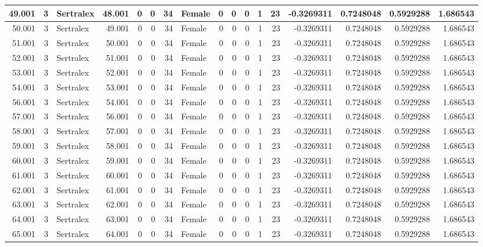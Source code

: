 \documentclass[
]{book}
\begin{document}
\begin{table}
\begin{tabular}[t]{r|r|l|r|r|r|r|l|r|r|r|r|r|r|r|r|r}
\hline
49.001 & 3 & Sertralex & 48.001 & 0 & 0 & 34 & Female & 0 & 0 & 0 & 1 & 23 & -0.3269311 & 0.7248048 & 0.5929288 & 1.686543\\
\hline
50.001 & 3 & Sertralex & 49.001 & 0 & 0 & 34 & Female & 0 & 0 & 0 & 1 & 23 & -0.3269311 & 0.7248048 & 0.5929288 & 1.686543\\
\hline
51.001 & 3 & Sertralex & 50.001 & 0 & 0 & 34 & Female & 0 & 0 & 0 & 1 & 23 & -0.3269311 & 0.7248048 & 0.5929288 & 1.686543\\
\hline
52.001 & 3 & Sertralex & 51.001 & 0 & 0 & 34 & Female & 0 & 0 & 0 & 1 & 23 & -0.3269311 & 0.7248048 & 0.5929288 & 1.686543\\
\hline
53.001 & 3 & Sertralex & 52.001 & 0 & 0 & 34 & Female & 0 & 0 & 0 & 1 & 23 & -0.3269311 & 0.7248048 & 0.5929288 & 1.686543\\
\hline
54.001 & 3 & Sertralex & 53.001 & 0 & 0 & 34 & Female & 0 & 0 & 0 & 1 & 23 & -0.3269311 & 0.7248048 & 0.5929288 & 1.686543\\
\hline
56.001 & 3 & Sertralex & 54.001 & 0 & 0 & 34 & Female & 0 & 0 & 0 & 1 & 23 & -0.3269311 & 0.7248048 & 0.5929288 & 1.686543\\
\hline
57.001 & 3 & Sertralex & 56.001 & 0 & 0 & 34 & Female & 0 & 0 & 0 & 1 & 23 & -0.3269311 & 0.7248048 & 0.5929288 & 1.686543\\
\hline
58.001 & 3 & Sertralex & 57.001 & 0 & 0 & 34 & Female & 0 & 0 & 0 & 1 & 23 & -0.3269311 & 0.7248048 & 0.5929288 & 1.686543\\
\hline
59.001 & 3 & Sertralex & 58.001 & 0 & 0 & 34 & Female & 0 & 0 & 0 & 1 & 23 & -0.3269311 & 0.7248048 & 0.5929288 & 1.686543\\
\hline
60.001 & 3 & Sertralex & 59.001 & 0 & 0 & 34 & Female & 0 & 0 & 0 & 1 & 23 & -0.3269311 & 0.7248048 & 0.5929288 & 1.686543\\
\hline
61.001 & 3 & Sertralex & 60.001 & 0 & 0 & 34 & Female & 0 & 0 & 0 & 1 & 23 & -0.3269311 & 0.7248048 & 0.5929288 & 1.686543\\
\hline
62.001 & 3 & Sertralex & 61.001 & 0 & 0 & 34 & Female & 0 & 0 & 0 & 1 & 23 & -0.3269311 & 0.7248048 & 0.5929288 & 1.686543\\
\hline
63.001 & 3 & Sertralex & 62.001 & 0 & 0 & 34 & Female & 0 & 0 & 0 & 1 & 23 & -0.3269311 & 0.7248048 & 0.5929288 & 1.686543\\
\hline
64.001 & 3 & Sertralex & 63.001 & 0 & 0 & 34 & Female & 0 & 0 & 0 & 1 & 23 & -0.3269311 & 0.7248048 & 0.5929288 & 1.686543\\
\hline
65.001 & 3 & Sertralex & 64.001 & 0 & 0 & 34 & Female & 0 & 0 & 0 & 1 & 23 & -0.3269311 & 0.7248048 & 0.5929288 & 1.686543\\

\end{tabular}
\end{table}
\end{document}

